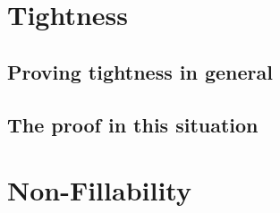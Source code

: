 \documentclass[oneside]{amsbook}
\begin{document}
\chapter{Tightness}

\section{Proving tightness in general}

\section{The proof in this situation}


\chapter{Non-Fillability}


\newpage


\end{document}
